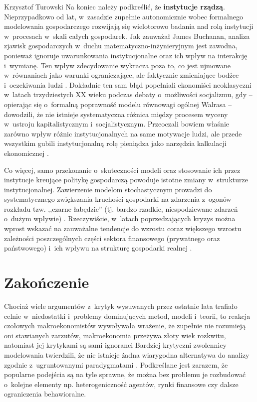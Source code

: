 \begin{artplenv}{Krzysztof Turowski}
Na koniec należy podkreślić, że \textbf{instytucje rządzą}. Nieprzypadkowo od lat, w~zasadzie zupełnie autonomicznie
wobec formalnego modelowania gospodarczego rozwijają się wielotorowo badania nad rolą instytucji w~procesach w~skali
całych gospodarek. Jak zauważał James Buchanan, analiza zjawisk gospodarczych w~duchu matematyczno-inżynieryjnym jest
zawodna, ponieważ ignoruje uwarunkowania instytucjonalne oraz ich wpływ na interakcję i~wymianę. Ten wpływ zdecydowanie
wykracza poza to, co jest ujmowane w~równaniach jako warunki ograniczające, ale faktycznie zmieniające
bodźce i~oczekiwania ludzi
\parencite{buchanan_economists_2009}.
Dokładnie ten sam błąd popełniali ekonomiści neoklasyczni
w~latach trzydziestych XX wieku podczas debaty o~możliwości socjalizmu, gdy  --  opierając się o~formalną
poprawność modelu równowagi ogólnej Walrasa  --  dowodzili, że nie istnieje systematyczna różnica między procesem
wyceny w~ustroju kapitalistycznym i~socjalistycznym. Przeoczali bowiem właśnie zarówno wpływ różnic instytucjonalnych
na same motywacje ludzi, ale przede wszystkim gubili instytucjonalną rolę pieniądza jako narzędzia kalkulacji
ekonomicznej
\parencite{mises_ludzkie_2007,mises_kalkulacja_2011}.

Co więcej, samo przekonanie o~skuteczności modeli oraz stosowanie ich przez instytucje kreujące politykę gospodarczą
powoduje istotne zmiany w~strukturze instytucjonalnej. Zawierzenie modelom stochastycznym prowadzi do systematycznego
zwiększania kruchości gospodarki na zdarzenia z~ogonów rozkładu tzw. ,,czarne łabędzie'' (tj. bardzo rzadkie,
niespodziewane zdarzeń o~dużym wpływie)
\parencite{taleb_antykruchosc:_2013}.
Rzeczywiście, w~latach poprzedzających
kryzys można wprost wskazać na zauważalne tendencje do wzrostu coraz większego wzrostu zależności poszczególnych części
sektora finansowego (prywatnego oraz państwowego) i~ich wpływu na strukturę gospodarki realnej
\parencite{jablecki_financial_2016}.

\section*{Zakończenie}
Chociaż wiele argumentów z~krytyk wysuwanych przez ostatnie lata trafiało celnie w~niedostatki i~problemy dominujących
metod, modeli i~teorii, to reakcja czołowych makroekonomistów wywoływała wrażenie, że zupełnie nie rozumieją oni
stawianych zarzutów, makroekonomia przeżywa złoty wiek rozkwitu, natomiast jej krytykami są sami ignoranci
\parencite{lucas_defence_2009,sargent_interview_2010}
Bardziej krytyczni zwolennicy modelowania twierdzili, że nie
istnieje żadna wiarygodna alternatywa do analizy zgodnie z~ugruntowanymi paradygmatami
\parencite{blanchard_tienen_2016,korinek_thoughts_2017}.
Podkreślane jest zarazem, że popularne podejścia są na tyle
sprawne, że można bez problemu je rozbudować o~kolejne elementy np. heterogeniczność agentów, rynki finansowe czy
dalsze ograniczenia behawioralne.


\end{artplenv}
